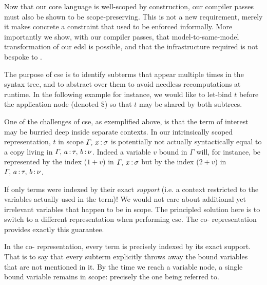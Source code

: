 
Now that our core language is well-scoped by construction, our compiler passes must also be shown to be scope-preserving.
%
This is not a new requirement, merely it makes concrete a constraint that used to be enforced informally.
%
More importantly we show, with our compiler passes, that model-to-same-model transformation of our \ac{edsl} is possible, and that the infrastructure required is not bespoke to \Velo{}.

The purpose of \ac{cse} is to identify subterms that appear multiple times in the syntax tree, and to abstract over them to avoid needless recomputations at runtime.
%
In the following example for instance, we would like to let-bind $t$ before the application node (denoted \$) so that $t$ may be shared by both subtrees.

\begin{center}
  \cseexamplegraph{}
\end{center}

One of the challenges of \ac{cse}, as exemplified above, is that the term of interest may be burried deep inside separate contexts.
%
In our intrinsically scoped representation, $t$ in scope
$\Gamma,\, x\,\mathord{:}\,\sigma$ is potentially not actually
syntactically equal to a copy living in $\Gamma,\, a\,\mathord{:}\,\tau,\, b\,\mathord{:}\,\nu$.
%
Indeed a variable $v$ bound in $\Gamma$ will, for instance, be
represented by the \DeBruijn{} index ($1+v$) in $\Gamma,\, x\,\mathord{:}\,\sigma$
but by the index ($2+v$) in $\Gamma,\, a\,\mathord{:}\,\tau,\, b\,\mathord{:}\,\nu$.

If only terms were indexed by their exact \emph{support}
(i.e. a context restricted to the variables actually used in the term)!
%
We would not care about additional yet irrelevant variables that happen to be in scope.
%
The principled solution here is to switch to a different representation when performing \ac{cse}.
%
The co-\DeBruijn{} representation~\cite{DBLP:journals/corr/abs-1807-04085} provides exactly this guarantee.


In the co-\DeBruijn{} representation, every term is precisely indexed by its exact support.
%
That is to say that every subterm explicitly throws away the bound variables that are not mentioned in it.
%
By the time we reach a variable node, a single bound variable remains in scope:
%
precisely the one being referred to.

